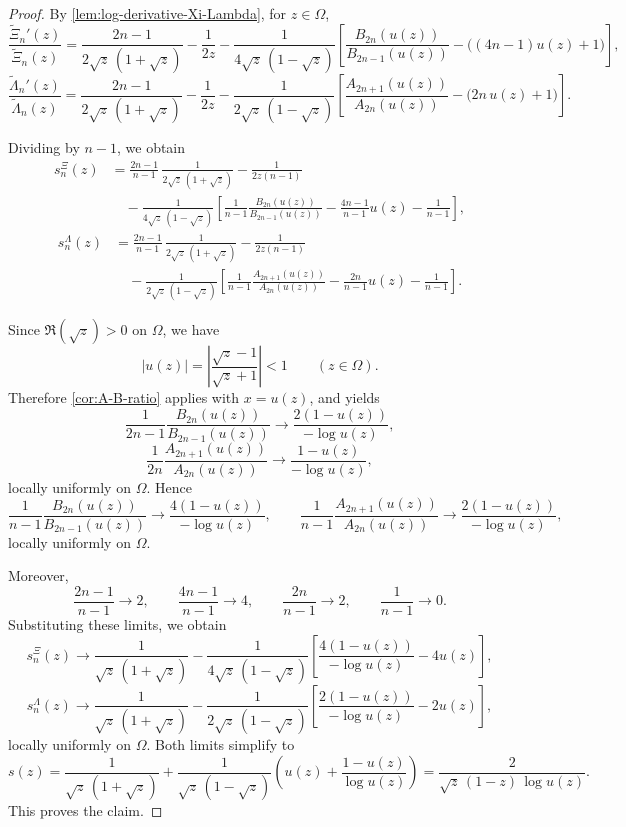 \documentclass[11pt,twoside]{article}
\numberwithin{equation}{section}
\begin{document}
\begin{proof}
By \cref{lem:log-derivative-Xi-Lambda}, for \(z\in\Omega\),
\[
\frac{\widetilde{\Xi}_n'(z)}{\widetilde{\Xi}_n(z)}
=
\frac{2n-1}{2\sqrt{z}\,(1+\sqrt{z})}
-\frac{1}{2z}
-\frac{1}{4\sqrt{z}\,(1-\sqrt{z})}
\left[
\frac{B_{2n}(u(z))}{B_{2n-1}(u(z))}
-\bigl((4n-1)u(z)+1\bigr)
\right],
\]
\[
\frac{\widetilde{\Lambda}_n'(z)}{\widetilde{\Lambda}_n(z)}
=
\frac{2n-1}{2\sqrt{z}\,(1+\sqrt{z})}
-\frac{1}{2z}
-\frac{1}{2\sqrt{z}\,(1-\sqrt{z})}
\left[
\frac{A_{2n+1}(u(z))}{A_{2n}(u(z))}
-\bigl(2n\,u(z)+1\bigr)
\right].
\]

Dividing by \(n-1\), we obtain
\[
\begin{aligned}
s_n^{\Xi}(z)
&=
\frac{2n-1}{n-1}\,\frac{1}{2\sqrt{z}\,(1+\sqrt{z})}
-\frac{1}{2z(n-1)} \\
&\quad
-\frac{1}{4\sqrt{z}\,(1-\sqrt{z})}
\left[
\frac{1}{n-1}\frac{B_{2n}(u(z))}{B_{2n-1}(u(z))}
-\frac{4n-1}{n-1}u(z)
-\frac{1}{n-1}
\right],
\end{aligned}
\]
\[
\begin{aligned}
s_n^{\Lambda}(z)
&=
\frac{2n-1}{n-1}\,\frac{1}{2\sqrt{z}\,(1+\sqrt{z})}
-\frac{1}{2z(n-1)} \\
&\quad
-\frac{1}{2\sqrt{z}\,(1-\sqrt{z})}
\left[
\frac{1}{n-1}\frac{A_{2n+1}(u(z))}{A_{2n}(u(z))}
-\frac{2n}{n-1}u(z)
-\frac{1}{n-1}
\right].
\end{aligned}
\]

Since \(\Re(\sqrt z)>0\) on \(\Omega\), we have
\[
|u(z)|=\left|\frac{\sqrt z-1}{\sqrt z+1}\right|<1
\qquad (z\in\Omega).
\]
Therefore \cref{cor:A-B-ratio} applies with \(x=u(z)\), and yields
\[
\frac{1}{2n-1}\frac{B_{2n}(u(z))}{B_{2n-1}(u(z))}
\longrightarrow
\frac{2(1-u(z))}{-\log u(z)},
\]
\[
\frac{1}{2n}\frac{A_{2n+1}(u(z))}{A_{2n}(u(z))}
\longrightarrow
\frac{1-u(z)}{-\log u(z)},
\]
locally uniformly on \(\Omega\). Hence
\[
\frac{1}{n-1}\frac{B_{2n}(u(z))}{B_{2n-1}(u(z))}
\longrightarrow
\frac{4(1-u(z))}{-\log u(z)},
\qquad
\frac{1}{n-1}\frac{A_{2n+1}(u(z))}{A_{2n}(u(z))}
\longrightarrow
\frac{2(1-u(z))}{-\log u(z)},
\]
locally uniformly on \(\Omega\).

Moreover,
\[
\frac{2n-1}{n-1}\to 2,
\qquad
\frac{4n-1}{n-1}\to 4,
\qquad
\frac{2n}{n-1}\to 2,
\qquad
\frac{1}{n-1}\to 0.
\]
Substituting these limits, we obtain
\[
s_n^{\Xi}(z)\longrightarrow
\frac{1}{\sqrt{z}\,(1+\sqrt{z})}
-\frac{1}{4\sqrt{z}\,(1-\sqrt{z})}
\left[
\frac{4(1-u(z))}{-\log u(z)}-4u(z)
\right],
\]
\[
s_n^{\Lambda}(z)\longrightarrow
\frac{1}{\sqrt{z}\,(1+\sqrt{z})}
-\frac{1}{2\sqrt{z}\,(1-\sqrt{z})}
\left[
\frac{2(1-u(z))}{-\log u(z)}-2u(z)
\right],
\]
locally uniformly on \(\Omega\). Both limits simplify to
\[
s(z)
=
\frac{1}{\sqrt{z}\,(1+\sqrt{z})}
+
\frac{1}{\sqrt{z}\,(1-\sqrt{z})}
\left(
u(z)+\frac{1-u(z)}{\log u(z)}
\right) = \frac{2}{\sqrt{z}\,(1-z)\,\log u(z)}.
\]
This proves the claim.
\end{proof}
\end{document}
